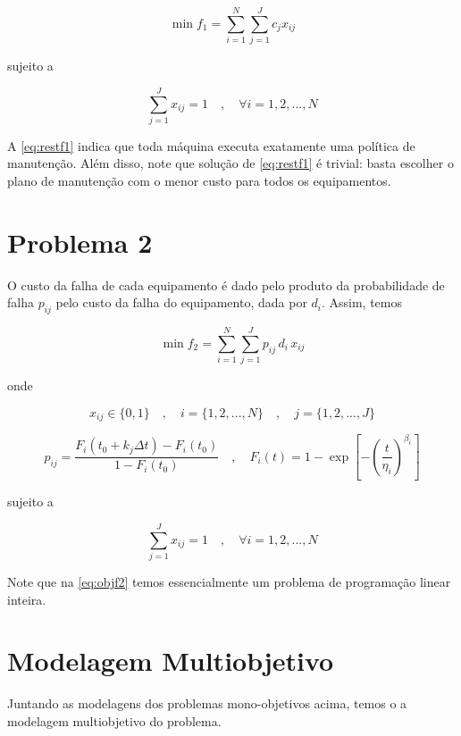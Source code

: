 \documentclass[
	12pt,				%
	oneside,			%
	a4paper,			%
	chapter=TITLE,
	sumario=tradicional,
	english,			%
	brazil				%
]{abntex2}
\begin{document}
\begin{equation}\label{eq:objf1}
	\min f_1 = \sum_{i=1}^{N} \sum_{j=1}^{J} c_j x_{ij}
\end{equation}

\noindent sujeito a 

\begin{equation}\label{eq:restf1}
	\sum_{j=1}^{J} x_{ij} = 1 \quad , \quad \forall i = {1, 2, ..., N}
\end{equation}

A \autoref{eq:restf1} indica que toda máquina executa exatamente uma política de manutenção.
Além disso, note que solução de \autoref{eq:restf1} é trivial: basta escolher o plano de 
manutenção com o menor custo para todos os equipamentos.

\section{Problema 2}

O custo da falha de cada equipamento é dado pelo produto da probabilidade de falha $p_{ij}$ pelo custo da falha do equipamento,
dada por $d_i$. Assim, temos 

\begin{equation}\label{eq:objf2}
	\min f_2 = \sum_{i=1}^{N} \sum_{j=1}^{J} p_{ij} \, d_i \, x_{ij}
\end{equation}

\noindent onde 

\[ x_{ij} \in \{0,1\} \quad , \quad i = \{1, 2, ..., N\}  \quad , \quad j = \{1, 2, ..., J\} \]

\[ 
p_{ij} = \frac{F_i \left(t_0 + k_j \Delta t \right) - F_i\left(t_0\right) }{1 - F_i\left(t_0\right)}
\quad , \quad 
F_i(t) = 1 - \exp \left[ - \left( \frac{t}{\eta_i} \right)^{\beta_i} \right] 
\]

\noindent sujeito a 

\begin{equation}\label{eq:restf2}
	\sum_{j=1}^{J} x_{ij} = 1 \quad , \quad \forall i = {1, 2, ..., N}
\end{equation}

Note que na \autoref{eq:objf2} temos essencialmente um problema de programação linear inteira.

\section{Modelagem Multiobjetivo}

Juntando as modelagens dos problemas mono-objetivos acima, temos o 
a modelagem multiobjetivo do problema.
\end{document}
